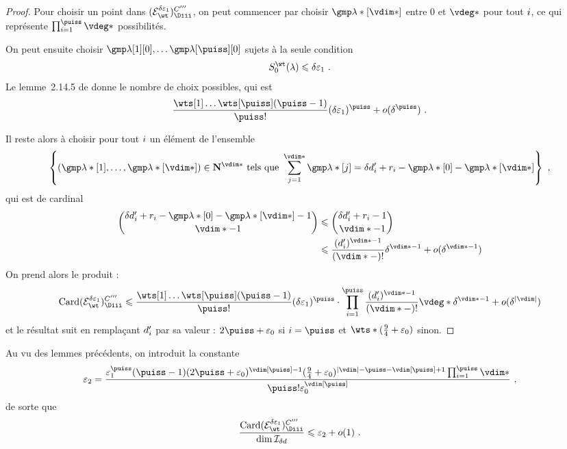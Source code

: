 \begin{proof}
  Pour choisir un point dans \( (\stairs)\Ciii \), on peut commencer par
  choisir \( \imp*[\vdim*] \) entre \( 0 \) et \( \vdeg* \)
  pour tout \( i \), ce qui représente \( \prod\fctrange \vdeg* \)
  possibilités.

  On peut ensuite choisir \( \imp[1][0], \dots \imp[\puiss][0] \)
  sujets à la seule condition
  \begin{equation}
    \wtsum*(\lambda) \le \delta \epsi \pmm.
  \end{equation}
  Le lemme~2.14.5 de \cite{farhith} donne le nombre de choix possibles, qui
  est
  \begin{equation}
    \frac {\prodwt} {\puiss !} (\delta\epsi)^\puiss
    + o(\delta^\puiss)
    \pmm.
  \end{equation}

  Il reste alors à choisir pour tout \( i \) un élément de l'ensemble
  \begin{equation}
    \left\{
      (\imp*[1],  \dots, \imp*[\vdim*])
      \in \N ^{\vdim*}
      \text{ tels que }
      \sum_{j=1}^{\vdim*} \imp*[j]
      =
      \delta d'_\fct + r_\fct - \imp*[0] - \imp*[\vdim*]
    \right\}
    \pmm,
  \end{equation}
  qui est de cardinal
  \begin{align}
    \binom {
      \delta d'_\fct + r_\fct - \imp*[0] - \imp*[\vdim*] - 1
      }{
      \vdim* - 1
      }
    & \le
    \binom {
      \delta d'_\fct + r_\fct - 1
      }{
      \vdim* - 1
      }
    \\
    & \le
    \frac {(d'_\fct)^{\vdim* - 1}} {(\vdim* - )!} \delta^{\vdim* - 1}
    + o( \delta^{\vdim* - 1} )
  \end{align}
  On prend alors le produit :
  \begin{equation}
    \card (\stairs)\Ciii
    \le
    \frac {\prodwt} {\puiss !} (\delta\epsi)^\puiss
    \cdot \prod\fctrange
    \frac {(d'_\fct)^{\vdim* - 1}} {(\vdim* - )!}
    \vdeg* \delta^{\vdim* - 1}
    + o( \delta^{\lgr\vdim} )
  \end{equation}
  et le résultat suit en remplaçant \( d'_i \) par sa valeur : \( 2\puiss +
  \epsz \) si \( \fct = \puiss \) et \( \wts* (\frac94 + \epsz) \) sinon.
\end{proof}

Au vu des lemmes précédents, on introduit la constante
\begin{equation} \label{e:def-epsii}
  \epsii
  =
  \frac {
    \epsi^\puiss (\puiss-1)
    (2\puiss + \epsz) ^{\vdim[\puiss]-1}
    (\frac94 + \epsz) ^{\lgr\vdim - \puiss - \vdim[\puiss] + 1}
    \prod\fctrange \vdim*
    }{
    \puiss! \epsz^{\vdim[\puiss]}
    }
  \pmm,
\end{equation}
de sorte que
\begin{equation} \label{e:good-codim}
  \frac {\card (\stairs)\Ciii} {\dim \Ideal_{\delta d}}
  \le
  \epsii + o(1)
  \pmm.
\end{equation}


